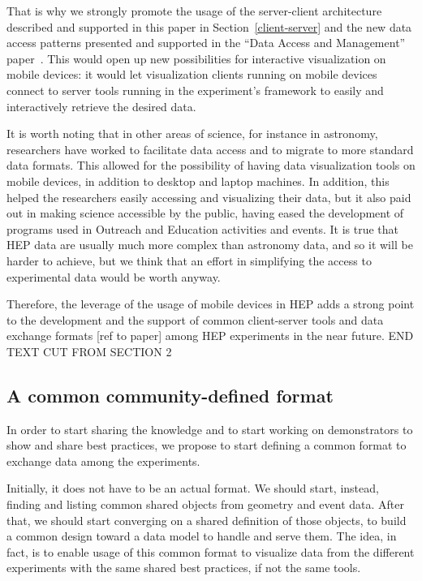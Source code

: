 \documentclass[12pt,a4paper]{article}
\begin{document}
That is why we strongly promote the usage of the server-client architecture described and supported in this paper in Section~\ref{client-server}
and the new data access patterns presented and supported in the ``Data Access and Management'' paper~\cite{HSF-CWP-2017-04}. This would open
up new possibilities for interactive visualization on mobile devices: it would let visualization clients running on mobile devices
connect to server tools running in the experiment's framework to easily and interactively retrieve the desired data.

It is worth noting that in other areas of science, for instance in astronomy, researchers have worked to facilitate data
access and to migrate to more standard data formats. This allowed for the possibility of having data visualization tools
on mobile devices, in addition to desktop and laptop machines. In addition, this helped the researchers easily accessing and visualizing
their data, but it also paid out in making science accessible by the public, having eased the development of programs used in
Outreach and Education activities and events. It is true that HEP data are usually much more complex than astronomy data, and so it
will be harder to achieve, but we think that an effort in simplifying the access to experimental data would be worth anyway.

Therefore, the leverage of the usage of mobile devices in HEP adds a strong point to the development and the support of common
client-server tools and data exchange formats [ref to paper] among HEP experiments in the near future.
END TEXT CUT FROM SECTION 2

\hypertarget{common-format}{%
\subsection{A common community-defined format}\label{common-format}}

In order to start sharing the knowledge and to start working on demonstrators to show and share best practices, we propose to
start defining a common format to exchange data among the experiments.

Initially, it does not have to be an actual format. We should start, instead, finding and listing common shared objects from geometry
and event data. After that, we should start converging on a shared definition of those objects, to build a common design toward
a data model to handle and serve them. The idea, in fact, is to enable usage of this common format to visualize data from the
different experiments with the same shared best practices, if not the same tools.
\end{document}
